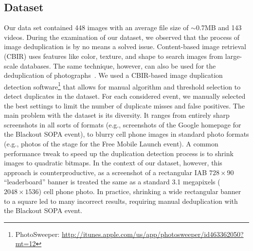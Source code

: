 \documentclass{acm_proc_article-sp}
\newcommand{\inlinelistingsize}{\fontsize{8pt}{11pt}}
\let\oldurl\url
\renewcommand{\url}[1]{\inlinelistingsize\oldurl{#1}}
\begin{document}
\subsection{Dataset} \label{subsec:dataset}
Our data set contained 448 images with an average file size of $\sim$0.7MB and 143 videos.
During the examination of our dataset, we observed that the process of image deduplication is by no means a solved issue.
Content-based image retrieval (CBIR) uses features like color, texture, and shape to search images from large-scale databases.
The same technique, however, can also be used for the deduplication of photographs~\cite{Pattabhi2011}.
We used a CBIR-based image duplication detection software\footnote{PhotoSweeper: \url{http://itunes.apple.com/us/app/photosweeper/id463362050?mt=12}} that allows for manual algorithm and threshold selection to detect duplicates in the dataset.
For each considered event, we manually selected the best settings to limit the number of duplicate misses and false positives.
The main problem with the dataset is its diversity.
It ranges from entirely sharp screenshots in all sorts of formats (e.g., screenshots of the Google homepage for the Blackout SOPA event), to blurry cell phone images in standard photo formats (e.g., photos of the stage for the Free Mobile Launch event).
A common performance tweak to speed up the duplication detection process is to shrink images to quadratic bitmaps.
In the context of our dataset, however, this approach is counterproductive, as a screenshot of a rectangular IAB $728 \times 90$ ``leaderboard'' banner is treated the same as a standard 3.1 megapixels ($2048 \times 1536$) cell phone photo.
In practice, shrinking a wide rectangular banner to a square led to many incorrect results, requiring manual deduplication with the Blackout SOPA event.
\end{document}
